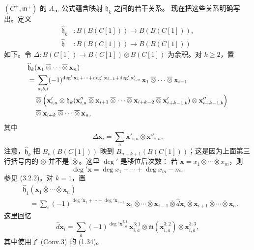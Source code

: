$(C^+,\mathfrak m^+)$ 的 $A_\infty$ 公式蕴含映射 $\mathfrak h_k$ 之间的若干关系。
现在把这些关系明确写出。定义
\[
\begin{aligned}
  \widehat{\mathfrak h}_k&\colon
  B(B(C[1]))\longrightarrow B(B(C[1])),\\
  \widehat{\mathfrak h}&\colon
  B(B(C[1]))\longrightarrow B(B(C[1]))
\end{aligned}
\]
如下。令
$\Delta\colon B(C[1])\to B(C[1])\otimes B(C[1])$ 为余积。对 $k\geq2$，置
\[
\begin{aligned}
 &\widehat{\mathfrak h}_k
 (\mathbf x_1\mathbin{\overline\otimes}\cdots
 \mathbin{\overline\otimes}\mathbf x_n)\\
 &={}\sum_{a,b,i}
 (-1)^{\deg'\mathbf x_1+\cdots+\deg'\mathbf x_{i-1}
 +\deg'\mathbf x'_{i,a}}\,
 \mathbf x_1\mathbin{\overline\otimes}\cdots
 \mathbin{\overline\otimes}\mathbf x_{i-1}\\
 &\quad{}\mathbin{\overline\otimes}
 \Bigl(
 \mathbf x'_{i,a}\otimes
 \mathfrak h_k(
 \mathbf x''_{i,a}\mathbin{\overline\otimes}\mathbf x_{i+1}
 \mathbin{\overline\otimes}\cdots
 \mathbin{\overline\otimes}\mathbf x_{i+k-2}
 \mathbin{\overline\otimes}\mathbf x'_{i+k-1,b})
 \otimes\mathbf x''_{i+k-1,b}
 \Bigr)\\
 &\quad{}\mathbin{\overline\otimes}\mathbf x_{i+k}
 \mathbin{\overline\otimes}\cdots
 \mathbin{\overline\otimes}\mathbf x_n,
\end{aligned}
\]
其中
\[
  \Delta\mathbf x_i
  =\sum_a\mathbf x'_{i,a}\otimes\mathbf x''_{i,a}.
\]
注意，$\widehat{\mathfrak h}_k$ 把 $B_n(B(C[1]))$ 映到
$B_{n-k+1}(B(C[1]))$；这是因为上面第三行括号内的
$\otimes$ 并不是 $\mathbin{\overline\otimes}$。这里 $\deg'$ 是移位后次数：
若 $\mathbf x=x_1\otimes\cdots\otimes x_m$，则
\[
  \deg'\mathbf x=\deg x_1+\cdots+\deg x_m-m;
\]
参见 (3.2.2)。对 $k=1$，置
\[
\begin{aligned}
 &\widehat{\mathfrak h}_1
 (\mathbf x_1\mathbin{\overline\otimes}\cdots
 \mathbin{\overline\otimes}\mathbf x_n)\\
 &\quad={}
 \sum_i(-1)^{\deg'\mathbf x_1+\cdots+\deg'\mathbf x_{i-1}}\,
 \mathbf x_1\mathbin{\overline\otimes}\cdots
 \mathbin{\overline\otimes}\mathbf x_{i-1}
 \mathbin{\overline\otimes}\widehat d\mathbf x_i
 \mathbin{\overline\otimes}\mathbf x_{i+1}
 \mathbin{\overline\otimes}\cdots
 \mathbin{\overline\otimes}\mathbf x_n.
\end{aligned}
\]
这里回忆
\[
  \widehat d\mathbf x_i
  =\sum_a(-1)^{\deg'\mathbf x_{i,a}^{3;1}}\,
  \mathbf x_{i,a}^{3;1}\otimes
  \mathfrak m(\mathbf x_{i,a}^{3;2})\otimes
  \mathbf x_{i,a}^{3;3},
\]
其中使用了 (Conv.3) 的 (1.34)。

